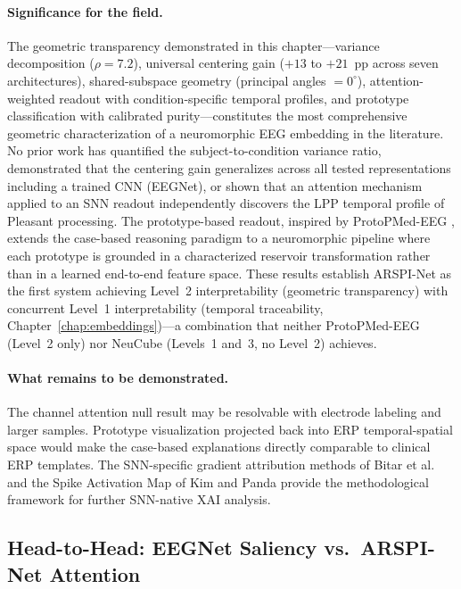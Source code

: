 \paragraph{Significance for the field.} The geometric transparency demonstrated in this chapter---variance decomposition ($\rho = 7.2$), universal centering gain ($+13$ to $+21$~pp across seven architectures), shared-subspace geometry (principal angles $= 0^\circ$), attention-weighted readout with condition-specific temporal profiles, and prototype classification with calibrated purity---constitutes the most comprehensive geometric characterization of a neuromorphic EEG embedding in the literature. No prior work has quantified the subject-to-condition variance ratio, demonstrated that the centering gain generalizes across all tested representations including a trained CNN (EEGNet), or shown that an attention mechanism applied to an SNN readout independently discovers the LPP temporal profile of Pleasant processing. The prototype-based readout, inspired by ProtoPMed-EEG \cite{barnett_protopmed_2024}, extends the case-based reasoning paradigm to a neuromorphic pipeline where each prototype is grounded in a characterized reservoir transformation rather than in a learned end-to-end feature space. These results establish ARSPI-Net as the first system achieving Level~2 interpretability (geometric transparency) with concurrent Level~1 interpretability (temporal traceability, Chapter~\ref{chap:embeddings})---a combination that neither ProtoPMed-EEG (Level~2 only) nor NeuCube (Levels~1 and~3, no Level~2) achieves.

\paragraph{What remains to be demonstrated.} The channel attention null result may be resolvable with electrode labeling and larger samples. Prototype visualization projected back into ERP temporal-spatial space would make the case-based explanations directly comparable to clinical ERP templates. The SNN-specific gradient attribution methods of Bitar et al.\ \cite{bitar_snn_grad_2023} and the Spike Activation Map of Kim and Panda \cite{kim_sam_2021} provide the methodological framework for further SNN-native XAI analysis.

\subsection{Head-to-Head: EEGNet Saliency vs.\ ARSPI-Net Attention}
\label{sec:shap_comparison}

